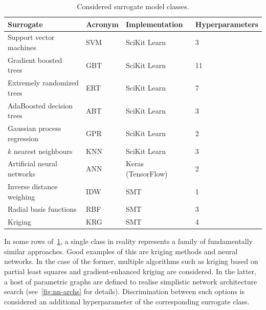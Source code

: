 \begin{table}[h]
	\centering
	{\footnotesize
		\begin{tabular}{llll}
		\toprule
		Surrogate & Acronym & Implementation & Hyperparameters \\
		\midrule
		Support vector machines~\cite{fan2008liblinear}	& SVM & SciKit Learn~\cite{scikit-learn} & 3 \\
		Gradient boosted trees~\cite{friedman2001greedy,friedman1999stochastic,hastie2009elements}	& GBT & SciKit Learn & 11 \\
		Extremely randomized trees~\cite{geurts2006extremely}	& ERT & SciKit Learn & 7 \\
		AdaBoosted decision trees~\cite{drucker1997improving}	& ABT & SciKit Learn & 3 \\
		Gaussian process regression~\cite{williams2006gaussian}	& GPR & SciKit Learn & 2 \\
		$k$ nearest neighbours	& KNN & SciKit Learn & 3 \\
		Artificial neural networks	& ANN & Keras (TensorFlow)~\cite{chollet2015keras} & 2 \\
		Inverse distance weighing~\cite{shepard1968two} & IDW & SMT~\cite{SMT2019} & 1 \\
		Radial basis functions & RBF & SMT & 3 \\
		Kriging~\cite{sacks1989designs,wold1975soft,bouhlel2016improving,bouhlel2016improved} & KRG & SMT & 4 \\
		\bottomrule
		\end{tabular}
	}
	\caption{Considered surrogate model classes.}
	\label{tbl:surrogates}
\end{table}

In some rows of~\cref{tbl:surrogates}, a single class in reality represents a
family of fundamentally similar approaches. Good examples of this are kriging methods and neural
networks. In the case of the former, multiple algorithms such as kriging based on
partial least squares and gradient-enhanced kriging are considered. In the
latter, a host of parametric graphs are defined to realise simplistic network
architecture search (see~\cref{fig:nn-archs} for details). Discrimination
between such options is considered an additional hyperparameter of the
corresponding surrogate class.

